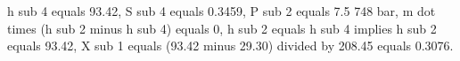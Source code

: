 h sub 4 equals 93.42,
S sub 4 equals 0.3459,
P sub 2 equals 7.5 748 bar,
m dot times (h sub 2 minus h sub 4) equals 0,
h sub 2 equals h sub 4 implies h sub 2 equals 93.42,
X sub 1 equals (93.42 minus 29.30) divided by 208.45 equals 0.3076.